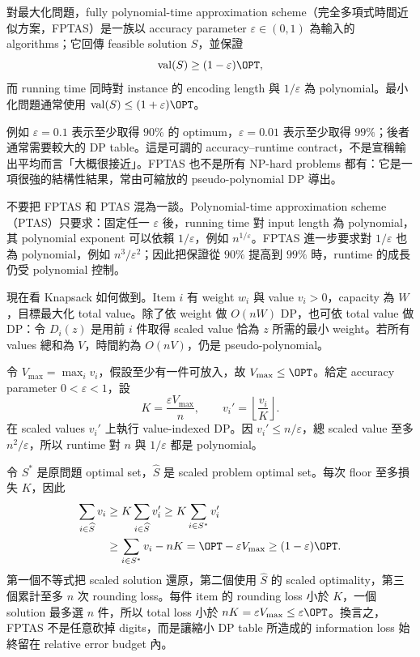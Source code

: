 \documentclass[11pt,a4paper,oneside,openany]{book}
\begin{document}
\begin{definition}[FPTAS]
對最大化問題，fully polynomial-time approximation scheme（完全多項式時間近似方案，FPTAS）是一族以 accuracy parameter $\varepsilon\in(0,1)$ 為輸入的 algorithms；它回傳 feasible solution $S$，並保證
\[
 \operatorname{val}(S)\ge(1-\varepsilon)\OPT,
\]
而 running time 同時對 instance 的 encoding length 與 $1/\varepsilon$ 為 polynomial。最小化問題通常使用 $\operatorname{val}(S)\le(1+\varepsilon)\OPT$。
\end{definition}

例如 $\varepsilon=0.1$ 表示至少取得 $90\%$ 的 optimum，$\varepsilon=0.01$ 表示至少取得 $99\%$；後者通常需要較大的 DP table。這是可調的 accuracy--runtime contract，不是宣稱輸出平均而言「大概很接近」。FPTAS 也不是所有 NP-hard problems 都有：它是一項很強的結構性結果，常由可縮放的 pseudo-polynomial DP 導出。

不要把 FPTAS 和 PTAS 混為一談。Polynomial-time approximation scheme（PTAS）只要求：固定任一 $\varepsilon$ 後，running time 對 input length 為 polynomial，其 polynomial exponent 可以依賴 $1/\varepsilon$，例如 $n^{1/\varepsilon}$。FPTAS 進一步要求對 $1/\varepsilon$ 也為 polynomial，例如 $n^3/\varepsilon^2$；因此把保證從 $90\%$ 提高到 $99\%$ 時，runtime 的成長仍受 polynomial 控制。

現在看 Knapsack 如何做到。Item $i$ 有 weight $w_i$ 與 value $v_i>0$，capacity 為 $W$，目標最大化 total value。除了依 weight 做 $O(nW)$ DP，也可依 total value 做 DP：令 $D_i(z)$ 是用前 $i$ 件取得 scaled value 恰為 $z$ 所需的最小 weight。若所有 values 總和為 $V$，時間約為 $O(nV)$，仍是 pseudo-polynomial。

令 $V_{\max}=\max_i v_i$，假設至少有一件可放入，故 $V_{\max}\le\OPT$。給定 accuracy parameter $0<\varepsilon<1$，設
\[
 K=\frac{\varepsilon V_{\max}}{n},
 \qquad
 v_i'=\left\lfloor\frac{v_i}{K}\right\rfloor.
\]
在 scaled values $v_i'$ 上執行 value-indexed DP。因 $v_i'\le n/\varepsilon$，總 scaled value 至多 $n^2/\varepsilon$，所以 runtime 對 $n$ 與 $1/\varepsilon$ 都是 polynomial。

令 $S^*$ 是原問題 optimal set，$\widehat S$ 是 scaled problem optimal set。每次 floor 至多損失 $K$，因此
\begin{align*}
 \sum_{i\in\widehat S}v_i
 &\ge K\sum_{i\in\widehat S}v_i'
 \ge K\sum_{i\in S^*}v_i'\\
 &\ge \sum_{i\in S^*}v_i-nK
 =\OPT-\varepsilon V_{\max}
 \ge(1-\varepsilon)\OPT.
\end{align*}
第一個不等式把 scaled solution 還原，第二個使用 $\widehat S$ 的 scaled optimality，第三個累計至多 $n$ 次 rounding loss。每件 item 的 rounding loss 小於 $K$，一個 solution 最多選 $n$ 件，所以 total loss 小於 $nK=\varepsilon V_{\max}\le\varepsilon\OPT$。換言之，FPTAS 不是任意砍掉 digits，而是讓縮小 DP table 所造成的 information loss 始終留在 relative error budget 內。
\end{document}
